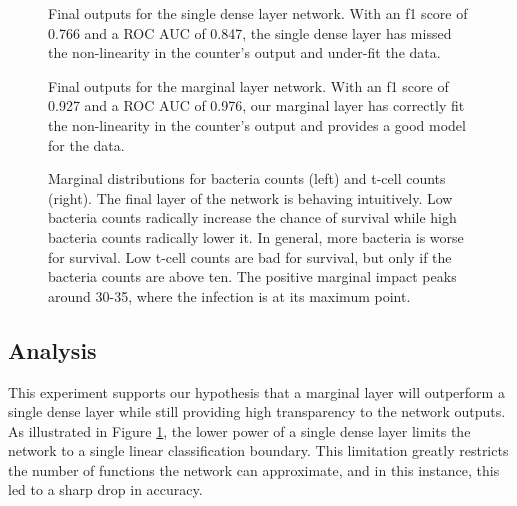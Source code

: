 \begin{figure}

\centering
\caption{Final outputs for the single dense layer network. With an f1 score of 0.766 and a ROC AUC of 0.847, the single dense layer has missed the non-linearity in the counter's output and under-fit the data.}
\label{fig:pandemic_cmp_result}
\end{figure}


\begin{figure}

\centering
\caption{Final outputs for the marginal layer network. With an f1 score of 0.927 and a ROC AUC of 0.976, our marginal layer has correctly fit the non-linearity in the counter's output and provides a good model for the data.}
\label{fig:pandemic_mnn_result}
\end{figure}


\begin{figure}
\centering
\begin{subfigure}{.5\textwidth}
  \centering
  
\end{subfigure}%
\begin{subfigure}{.5\textwidth}
  \centering
  
\end{subfigure}
\caption{Marginal distributions for bacteria counts (left) and t-cell counts (right). The final layer of the network is behaving intuitively. Low bacteria counts radically increase the chance of survival while high bacteria counts radically lower it. In general, more bacteria is worse for survival. Low t-cell counts are bad for survival, but only if the bacteria counts are above ten. The positive marginal impact peaks around 30-35, where the infection is at its maximum point.}
\label{fig:pandemic_marginals}
\end{figure}


\subsection{Analysis}

This experiment supports our hypothesis that a marginal layer will outperform a single dense layer while still providing high transparency to the network outputs. As illustrated in Figure \ref{fig:pandemic_cmp_result}, the lower power of a single dense layer limits the network to a single linear classification boundary. This limitation greatly restricts the number of functions the network can approximate, and in this instance, this led to a sharp drop in accuracy. 

